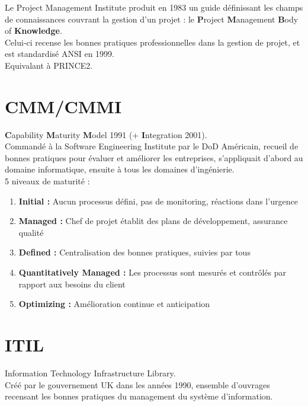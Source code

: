 \documentclass{report}
\begin{document}
		Le Project Management Institute produit en 1983 un guide définissant les champs de connaissances couvrant la gestion d'un projet : le \textbf{P}roject \textbf{M}anagement \textbf{B}ody of \textbf{Knowledge}.\\
		Celui-ci recense les bonnes pratiques professionnelles dans la gestion de projet, et est standardisé ANSI en 1999.\\

		Equivalant à PRINCE2.\\

	\section{CMM/CMMI}

		\textbf{C}apability \textbf{M}aturity \textbf{M}odel 1991 (+ \textbf{I}ntegration 2001).\\

		Commandé à la Software Engineering Institute par le DoD Américain, recueil de bonnes pratiques pour évaluer et améliorer les entreprises, s'appliquait d'abord au domaine informatique, ensuite à tous les domaines d'ingénierie.\\

		5 niveaux de maturité : \\

		\begin{enumerate}
			\item \textbf{Initial : }Aucun processus défini, pas de monitoring, réactions dans l'urgence
			\item \textbf{Managed : }Chef de projet établit des plans de développement, assurance qualité
			\item \textbf{Defined : }Centralisation des bonnes pratiques, suivies par tous
			\item \textbf{Quantitatively Managed : }Les processus sont mesurés et contrôlés par rapport aux besoins du client
			\item \textbf{Optimizing : }Amélioration continue et anticipation
		\end{enumerate}

	\section{ITIL}

		Information Technology Infrastructure Library.\\

		Créé par le gouvernement UK dans les années 1990, ensemble d'ouvrages recensant les bonnes pratiques du management du système d'information.\\
\end{document}
